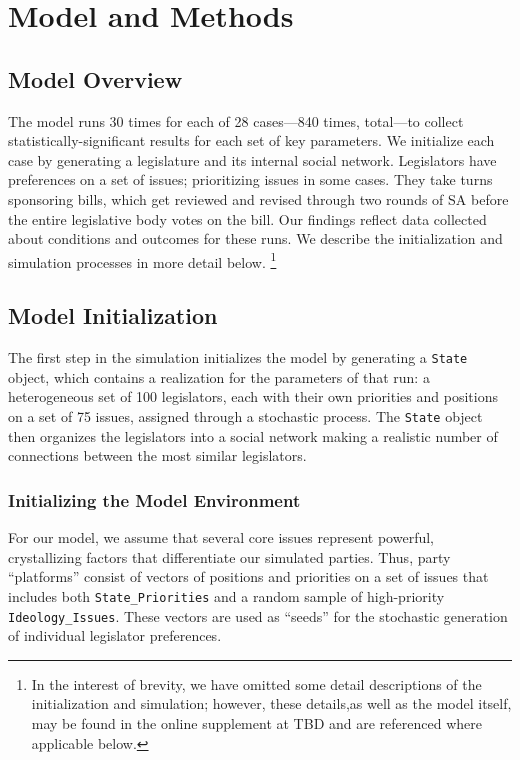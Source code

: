 \documentclass[pdftex,12pt,oribibl]{llncs}
\begin{document}
\section{Model and Methods}
%
%

\subsection{Model Overview}
The model runs 30 times for each of 28 cases---840 times, total---to collect statistically-significant results for each set of key parameters.
We initialize each case by generating a legislature and its internal social network. 
Legislators have preferences on a set of issues; prioritizing issues in some cases.
They take turns sponsoring bills, which get reviewed and revised through two rounds of SA before the entire legislative body votes on the bill.
Our findings reflect data collected about conditions and outcomes for these runs.
We describe the initialization and simulation processes in more detail below.
\footnote{In the interest of brevity, we have omitted some detail descriptions of the initialization and simulation; however, these details,as well as the model itself, may be found in the online supplement at TBD and are referenced where applicable below.}

\subsection{Model Initialization}
The first step in the simulation initializes the model by generating a \texttt{State} object, which contains a realization for the parameters of that run: a heterogeneous set of 100 legislators, each with their own priorities and positions on a set of 75 issues, assigned through a stochastic process. 
The \texttt{State} object then organizes the legislators into a social network making a realistic number of connections between the most similar legislators.

\subsubsection{Initializing the Model Environment}
For our model, we assume that several core issues represent powerful, crystallizing factors that differentiate our simulated parties.
Thus, party ``platforms'' consist of vectors of positions and priorities on a set of issues that includes both \texttt{State\_Priorities} and a random sample of high-priority \texttt{Ideology\_Issues}.
These vectors are used as ``seeds'' for the stochastic generation of individual legislator preferences.
\end{document}
